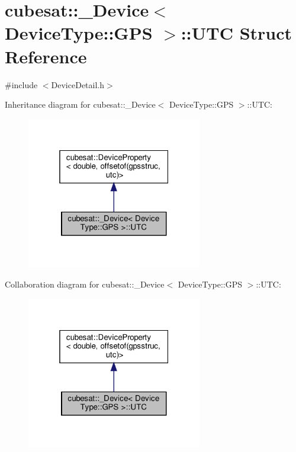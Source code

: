 \hypertarget{structcubesat_1_1__Device_3_01DeviceType_1_1GPS_01_4_1_1UTC}{}\section{cubesat\+:\+:\+\_\+\+Device$<$ Device\+Type\+:\+:G\+PS $>$\+:\+:U\+TC Struct Reference}
\label{structcubesat_1_1__Device_3_01DeviceType_1_1GPS_01_4_1_1UTC}


{\ttfamily \#include $<$Device\+Detail.\+h$>$}



Inheritance diagram for cubesat\+:\+:\+\_\+\+Device$<$ Device\+Type\+:\+:G\+PS $>$\+:\+:U\+TC\+:\nopagebreak
\begin{figure}[H]
\begin{center}
\leavevmode
\includegraphics[width=217pt]{structcubesat_1_1__Device_3_01DeviceType_1_1GPS_01_4_1_1UTC__inherit__graph}
\end{center}
\end{figure}


Collaboration diagram for cubesat\+:\+:\+\_\+\+Device$<$ Device\+Type\+:\+:G\+PS $>$\+:\+:U\+TC\+:\nopagebreak
\begin{figure}[H]
\begin{center}
\leavevmode
\includegraphics[width=217pt]{structcubesat_1_1__Device_3_01DeviceType_1_1GPS_01_4_1_1UTC__coll__graph}
\end{center}
\end{figure}
